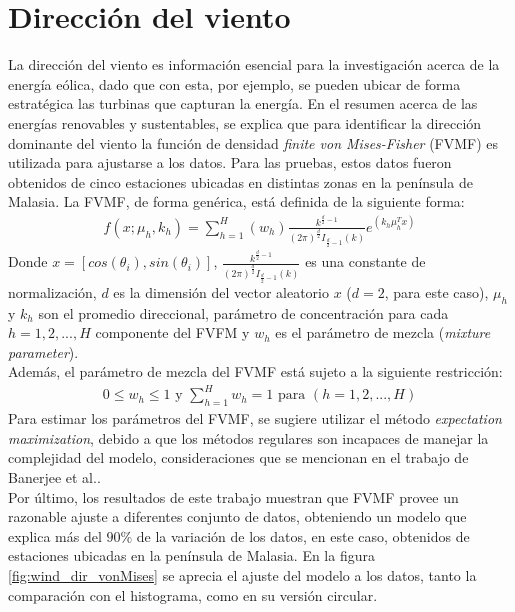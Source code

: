 \section{Dirección del viento}
La dirección del viento es información esencial para la investigación acerca de la energía eólica, dado que con esta, por ejemplo, se pueden ubicar de forma estratégica las turbinas que capturan la energía. En el resumen acerca de las energías renovables y sustentables\cite{Winddirelse15}, se explica que para identificar la dirección dominante del viento la función de densidad \emph{finite von Mises-Fisher} (FVMF) es utilizada para ajustarse a los datos. Para las pruebas, estos datos fueron obtenidos de cinco estaciones ubicadas en distintas zonas en la península de Malasia. La FVMF, de forma genérica, está definida de la siguiente forma:
\begin{align}
    f(x;\mu_{h}, k_{h}) = \sum_{h=1}^{H}(w_{h})\frac{k^{\frac{d}{2} - 1}}{(2\pi)^{\frac{d}{2}}I_{\frac{d}{2} - 1} (k)}e^{(k_h\mu_{h}^{T}x)}
\end{align}    
Donde $x=[cos(\theta_i), sin(\theta_i)]$, $\frac{k^{\frac{d}{2} - 1}}{(2\pi)^{\frac{d}{2}}I_{\frac{d}{2} - 1} (k)}$ es una constante de normalización, $d$ es la dimensión del vector aleatorio $x$ ($d = 2$, para este caso), $\mu_{h}$ y $k_h$ son el promedio direccional, parámetro de concentración para cada $h = 1, 2,...,H$ componente del FVFM y $w_h$ es el parámetro de mezcla (\emph{mixture parameter}).\\
Además, el parámetro de mezcla del FVMF está sujeto a la siguiente restricción:
\begin{align}
    0 \leq w_h \leq 1 \text{ y } \sum_{h=1}^{H} w_{h} = 1 \text{ para } (h=1,2,...,H) 
\end{align}
Para estimar los parámetros del FVMF, se sugiere utilizar el método \emph{expectation maximization}, debido a que los métodos regulares son incapaces de manejar la complejidad del modelo, consideraciones que se mencionan en el trabajo de Banerjee et al.\cite{Banerjee05}.\\
Por último, los resultados de este trabajo muestran que FVMF provee un razonable ajuste a diferentes conjunto de datos, obteniendo un modelo que explica más del $90\%$ de la variación de los datos, en este caso, obtenidos de estaciones ubicadas en la península de Malasia. En la figura \ref{fig:wind_dir_vonMises} se aprecia el ajuste del modelo a los datos, tanto la comparación con el histograma, como en su versión circular.\\
